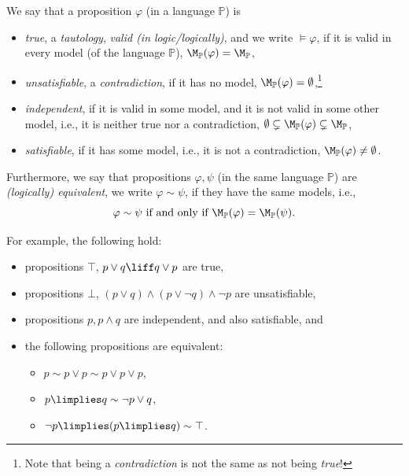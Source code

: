 \begin{definition}\label{definition:semantic-notions}
We say that a proposition $\varphi$ (in a language $\mathbb P$) is
\begin{itemize}
    \item \emph{true}, a \emph{tautology}, \emph{valid (in logic/logically)}, and we write $\models \varphi$, if it is valid in every model (of the language $\mathbb P$), $\M_\mathbb P(\varphi) = \M_\mathbb P$,
    \item \emph{unsatisfiable}, a \emph{contradiction}, if it has no model, $\M_\mathbb P(\varphi) = \emptyset$,\footnote{Note that being a \emph{contradiction} is not the same as not being \emph{true}!}
    \item \emph{independent}, if it is valid in some model, and it is not valid in some other model, i.e., it is neither true nor a contradiction, $\emptyset \subsetneq \M_\mathbb P(\varphi) \subsetneq \M_\mathbb P$,
    \item \emph{satisfiable}, if it has some model, i.e., it is not a contradiction, $\M_\mathbb P(\varphi) \neq \emptyset$.
\end{itemize}
Furthermore, we say that propositions $\varphi, \psi$ (in the same language $\mathbb P$) are \emph{(logically) equivalent}, we write $\varphi \sim \psi$, if they have the same models, i.e.,
$$
\varphi \sim \psi \text{ if and only if } \M_\mathbb P(\varphi) = \M_\mathbb P(\psi).
$$    
\end{definition}

\begin{example} For example, the following hold:
    \begin{itemize}
        \item propositions $\top$, $p \lor q \liff q \lor p$ are true,
        \item propositions $\bot$, $(p \lor q) \land (p \lor \neg q) \land \neg p$ are unsatisfiable,
        \item propositions $p, p \land q$ are independent, and also satisfiable, and
        \item the following propositions are equivalent: 
        \begin{itemize}
            \item $p \sim p \lor p \sim p \lor p \lor p$,
            \item $p \limplies q \sim \neg p \lor q$,
            \item $\neg p \limplies (p \limplies q) \sim \top $.
        \end{itemize}  
    \end{itemize}      
\end{example}

